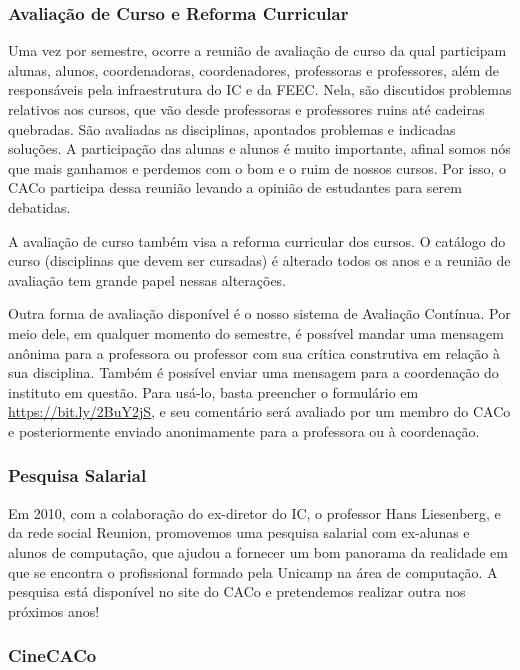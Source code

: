 \subsubsection{Avaliação de Curso e Reforma Curricular}

Uma vez por semestre, ocorre a reunião de avaliação de curso da qual participam
alunas, alunos, coordenadoras, coordenadores, professoras e professores, além
de responsáveis pela infraestrutura do IC e da FEEC. Nela, são discutidos
problemas relativos aos cursos, que vão desde professoras e professores ruins
até cadeiras quebradas. São avaliadas as disciplinas, apontados problemas e
indicadas soluções. A participação das alunas e alunos é muito importante,
afinal somos nós que mais ganhamos e perdemos com o bom e o ruim de nossos
cursos. Por isso, o CACo participa dessa reunião levando a opinião de
estudantes para serem debatidas.

A avaliação de curso também visa a reforma curricular dos cursos. O catálogo do
curso (disciplinas que devem ser cursadas) é alterado todos os anos e a reunião
de avaliação tem grande papel nessas alterações.

Outra forma de avaliação disponível é o nosso sistema de Avaliação Contínua.
Por meio dele, em qualquer momento do semestre, é possível mandar uma mensagem
anônima para a professora ou professor com sua crítica construtiva em relação à
sua disciplina. Também é possível enviar uma mensagem para a coordenação do
instituto em questão. Para usá-lo, basta preencher o formulário em
\url{https://bit.ly/2BuY2jS}, e seu comentário será avaliado por um membro do
CACo e posteriormente enviado anonimamente para a professora ou à coordenação.

\subsubsection{Pesquisa Salarial}

Em 2010, com a colaboração do ex-diretor do IC, o professor Hans Liesenberg, e
da rede social Reunion, promovemos uma pesquisa salarial com ex-alunas e alunos
de computação, que ajudou a fornecer um bom panorama da realidade em que se
encontra o profissional formado pela Unicamp na área de computação. A pesquisa
está disponível no site do CACo e pretendemos realizar outra nos próximos anos!

\subsubsection{CineCACo}

